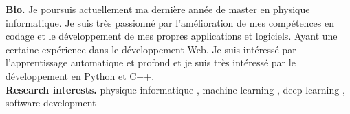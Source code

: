 \par{
{\textbf{Bio.}} 
Je poursuis actuellement ma dernière année de master en physique informatique. Je suis très passionné par l'amélioration de mes compétences en codage et le développement de mes propres applications et logiciels. Ayant une certaine expérience dans le développement Web. Je suis intéressé par l'apprentissage automatique et profond et je suis très intéressé par le développement en Python et C++.\\
{\textbf{Research interests.}} 
physique informatique , machine learning , deep learning , software development  
}